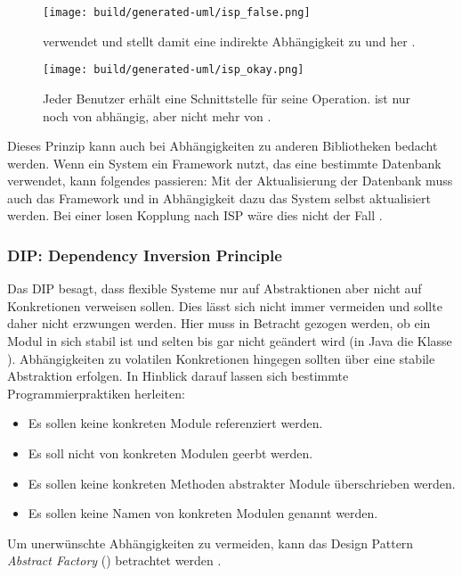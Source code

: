 \begin{figure}
  \centering
  \texttt{[image: build/generated-uml/isp\_false.png]}
   \caption{ verwendet  und stellt damit eine indirekte Abhängigkeit zu  und  her \citep[vgl.][84]{martin2018}.}
   \label{fig:isp_false}
\end{figure}

\begin{figure}
  \centering
  \texttt{[image: build/generated-uml/isp\_okay.png]}
   \caption{Jeder Benutzer erhält eine Schnittstelle für seine Operation.  ist nur noch von  abhängig, aber nicht mehr von  \citep[vgl.][85]{martin2018}.}
   \label{fig:isp_okay}
\end{figure}

Dieses Prinzip kann auch bei Abhängigkeiten zu anderen Bibliotheken bedacht werden. Wenn ein System ein Framework nutzt, das eine bestimmte Datenbank  verwendet, kann folgendes passieren: Mit der Aktualisierung der Datenbank muss auch das Framework und \ggf in Abhängigkeit dazu das System selbst aktualisiert werden. Bei einer losen Kopplung nach \ac{ISP} wäre dies nicht der Fall \citep[vgl.][86]{martin2018}.

\subsubsection{DIP: Dependency Inversion Principle}

Das \ac{DIP} besagt, dass flexible Systeme nur auf Abstraktionen aber nicht auf Konkretionen verweisen sollen. Dies lässt sich nicht immer vermeiden und sollte daher nicht erzwungen werden. Hier muss in Betracht gezogen werden, ob ein Modul in sich stabil ist und selten bis gar nicht geändert wird (\zb in Java die Klasse ). Abhängigkeiten zu volatilen Konkretionen hingegen sollten über eine stabile Abstraktion erfolgen.
In Hinblick darauf lassen sich bestimmte Programmierpraktiken herleiten:
\begin{itemize}
\item Es sollen keine konkreten Module referenziert werden. 
\item Es soll nicht von konkreten Modulen geerbt werden.
\item Es sollen keine konkreten Methoden abstrakter Module überschrieben werden.
\item Es sollen keine Namen von konkreten Modulen genannt werden.
\end{itemize}
Um unerwünschte Abhängigkeiten zu vermeiden, kann \zb das Design Pattern \textit{Abstract Factory} () betrachtet werden \citep[vgl.][87\psq]{martin2018}. 

